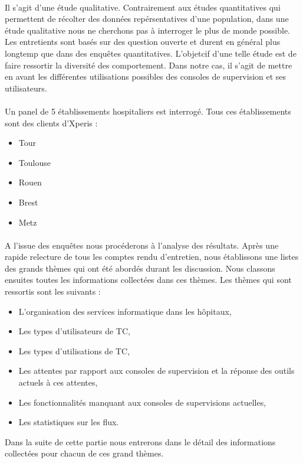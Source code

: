 			\paragraph{}%
			Il s'agit d'une étude qualitative. Contrairement aux études quantitatives qui
			permettent de récolter des données repérsentatives d'une population,
			dans une étude qualitative nous ne cherchons pas à interroger le plus de
			monde possible. Les entretients sont basés sur des question ouverte et durent
			en général plus longtemp que dans des enquêtes quantitatives. L'objetcif
			d'une telle étude est de faire ressortir la diversité des comportement. Dans
			notre cas, il s'agit de mettre en avant les différentes utilisations
			possibles des consoles de supervision et ses utilisateurs.
			
			\paragraph{}%
			Un panel de 5 établissements hospitaliers est interrogé. Tous ces
			établissements sont des clients d’Xperis :
			\begin{itemize}
			  \item Tour
			  \item Toulouse
			  \item Rouen
			  \item Brest
			  \item Metz
			\end{itemize}
			
			\paragraph{}%
			A l'issue des enquêtes nous procéderons à l'analyse des résultats. Après une
			rapide relecture de tous les comptes rendu d'entretien, nous établissons une
			listes des grands thèmes qui ont été abordés durant les discussion. Nous
			classons ensuites toutes les informations collectées dans ces thèmes.\newline
			Les thèmes qui sont ressortis sont les suivants :
			\begin{itemize}
			  \item L’organisation des services informatique dans les hôpitaux,
			  \item Les types d’utilisateurs de TC,
			  \item Les types d’utilisations de TC,
			  \item Les attentes par rapport aux consoles de supervision et la réponse
			  des outils actuels à ces attentes,
			  \item Les fonctionnalités manquant aux consoles de supervisions
			  actuelles,
			  \item Les statistiques sur les flux.
			\end{itemize}
			Dans la suite de cette partie nous entrerons dans le détail des informations
			collectées pour chacun de ces grand thèmes.
			
